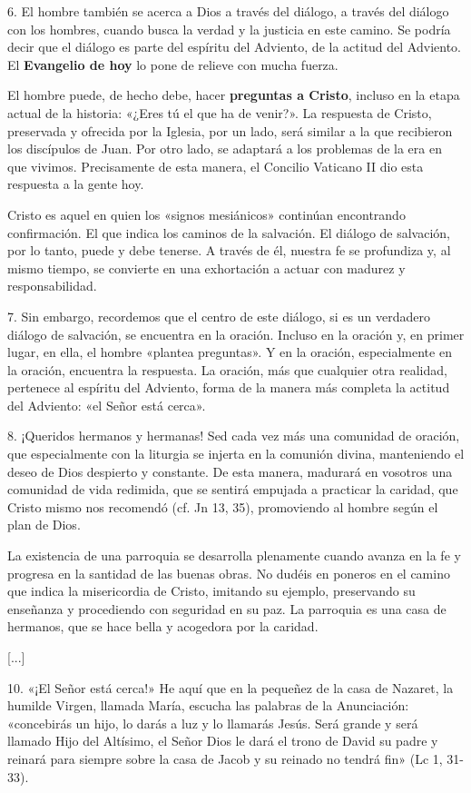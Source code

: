 \documentclass[]{article}
\begin{document}
6. El hombre también se acerca a Dios a través del diálogo, a través del
diálogo con los hombres, cuando busca la verdad y la justicia en este
camino. Se podría decir que el diálogo es parte del espíritu del
Adviento, de la actitud del Adviento. El \textbf{Evangelio de hoy} lo
pone de relieve con mucha fuerza.

El hombre puede, de hecho debe, hacer \textbf{preguntas a Cristo},
incluso en la etapa actual de la historia: «¿Eres tú el que ha de
venir?». La respuesta de Cristo, preservada y ofrecida por la Iglesia,
por un lado, será similar a la que recibieron los discípulos de Juan.
Por otro lado, se adaptará a los problemas de la era en que vivimos.
Precisamente de esta manera, el Concilio Vaticano II dio esta respuesta
a la gente hoy.

Cristo es aquel en quien los «signos mesiánicos» continúan encontrando
confirmación. El que indica los caminos de la salvación. El diálogo de
salvación, por lo tanto, puede y debe tenerse. A través de él, nuestra
fe se profundiza y, al mismo tiempo, se convierte en una exhortación a
actuar con madurez y responsabilidad.

7. Sin embargo, recordemos que el centro de este diálogo, si es un
verdadero diálogo de salvación, se encuentra en la oración. Incluso en
la oración y, en primer lugar, en ella, el hombre «plantea preguntas». Y
en la oración, especialmente en la oración, encuentra la respuesta. La
oración, más que cualquier otra realidad, pertenece al espíritu del
Adviento, forma de la manera más completa la actitud del Adviento: «el
Señor está cerca».

8. ¡Queridos hermanos y hermanas! Sed cada vez más una comunidad de
oración, que especialmente con la liturgia se injerta en la comunión
divina, manteniendo el deseo de Dios despierto y constante. De esta
manera, madurará en vosotros una comunidad de vida redimida, que se
sentirá empujada a practicar la caridad, que Cristo mismo nos recomendó
(cf. Jn 13, 35), promoviendo al hombre según el plan de Dios.

La existencia de una parroquia se desarrolla plenamente cuando avanza en
la fe y progresa en la santidad de las buenas obras. No dudéis en
poneros en el camino que indica la misericordia de Cristo, imitando su
ejemplo, preservando su enseñanza y procediendo con seguridad en su paz.
La parroquia es una casa de hermanos, que se hace bella y acogedora por
la caridad.

{[}...{]}

10. «¡El Señor está cerca!» He aquí que en la pequeñez de la casa de
Nazaret, la humilde Virgen, llamada María, escucha las palabras de la
Anunciación: «concebirás un hijo, lo darás a luz y lo llamarás Jesús.
Será grande y será llamado Hijo del Altísimo, el Señor Dios le dará el
trono de David su padre y reinará para siempre sobre la casa de Jacob y
su reinado no tendrá fin» (Lc 1, 31-33).
\end{document}
